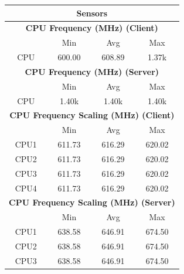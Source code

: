 \documentclass[11pt,a4paper,headinclude=false,footinclude=false]{scrreprt}
\begin{document}
\begin{table}[H]
\centering
    \begin{tabular}{||c|c|c|c|c|c|c||}
    \hline
    \multicolumn{7}{|c|}{\textbf{Sensors}} \\
    \hline
    \multicolumn{7}{|c|}{\textbf{CPU Frequency (MHz) (Client)}} \\
    \hline\hline
      & \multicolumn{2}{|c|}{Min} & \multicolumn{2}{|c|}{Avg} & \multicolumn{2}{|c|}{Max} \\
    \hline
    CPU & \multicolumn{2}{|c|}{600.00} & \multicolumn{2}{|c|}{608.89} & \multicolumn{2}{|c|}{1.37k} \\
    \hline\hline
    \multicolumn{7}{|c|}{\textbf{CPU Frequency (MHz) (Server)}} \\
    \hline\hline
      & \multicolumn{2}{|c|}{Min} & \multicolumn{2}{|c|}{Avg} & \multicolumn{2}{|c|}{Max} \\
    \hline
    CPU & \multicolumn{2}{|c|}{1.40k} & \multicolumn{2}{|c|}{1.40k} & \multicolumn{2}{|c|}{1.40k} \\
    \hline\hline
    \multicolumn{7}{|c|}{\textbf{CPU Frequency Scaling (MHz) (Client)}} \\
    \hline
      & \multicolumn{2}{|c|}{Min} & \multicolumn{2}{|c|}{Avg} & \multicolumn{2}{|c|}{Max} \\
    \hline
    CPU1 & \multicolumn{2}{|c|}{611.73} & \multicolumn{2}{|c|}{616.29} & \multicolumn{2}{|c|}{620.02} \\
    \hline
    CPU2 & \multicolumn{2}{|c|}{611.73} & \multicolumn{2}{|c|}{616.29} & \multicolumn{2}{|c|}{620.02} \\
    \hline
    CPU3 & \multicolumn{2}{|c|}{611.73} & \multicolumn{2}{|c|}{616.29} & \multicolumn{2}{|c|}{620.02} \\
    \hline
    CPU4 & \multicolumn{2}{|c|}{611.73} & \multicolumn{2}{|c|}{616.29} & \multicolumn{2}{|c|}{620.02} \\
    \hline\hline
    \multicolumn{7}{|c|}{\textbf{CPU Frequency Scaling (MHz) (Server)}} \\
    \hline
      & \multicolumn{2}{|c|}{Min} & \multicolumn{2}{|c|}{Avg} & \multicolumn{2}{|c|}{Max} \\
    \hline
    CPU1 & \multicolumn{2}{|c|}{638.58} & \multicolumn{2}{|c|}{646.91} & \multicolumn{2}{|c|}{674.50} \\
    \hline
    CPU2 & \multicolumn{2}{|c|}{638.58} & \multicolumn{2}{|c|}{646.91} & \multicolumn{2}{|c|}{674.50} \\
    \hline
    CPU3 & \multicolumn{2}{|c|}{638.58} & \multicolumn{2}{|c|}{646.91} & \multicolumn{2}{|c|}{674.50} \\

\end{tabular}
\end{table}
\end{document}

